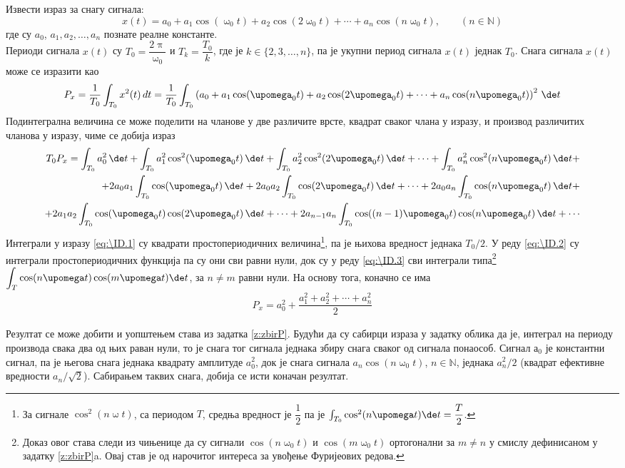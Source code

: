 \noindent 
\PID
Извести израз за снагу сигнала: 
$$
x(t) = a_0 + a_1\cos(\upomega_0 t) +
a_2 \cos(2\upomega_0 t) + \cdots 
+ a_n \cos(n\upomega_0 t), \qquad (n\in\mathbb N)
$$
где су $a_0$, $a_1, a_2, \ldots, a_n$ познате реалне
константе.
\\[2mm]

\RESENJE 
Периоди сигнала $x(t)$ су $T_0 = \dfrac{2\uppi}{\upomega_0}$ и $T_k = \dfrac{T_0}{k}$, где је $k \in \{2,3,\ldots,n\}$, 
па је укупни период сигнала $x(t)$ једнак $T_0$. Снага сигнала $x(t)$ може се изразити као 
\begin{equation}
P_x = \dfrac{1}{T_0}\int_{T_0} x^2(t) \, dt =  \dfrac{1}{T_0} \int_{T_0} \left( a_0 + a_1\cos(\upomega_0 t) +
a_2 \cos(2\upomega_0 t) + \cdots
+ a_n \cos(n\upomega_0 t) \right)^2 \, \de t \\
\end{equation}
Подинтегрална величина се може поделити на чланове у две различите врсте, квадрат сваког члана у изразу, и производ различитих
чланова у изразу, чиме се добија израз
\begin{eqnarray}
T_0 P_x = \int_{T_0} a_0^2 \, \de t + \int_{T_0} a_1^2\cos^2(\upomega_0 t) \, \de t   \label{eq:\ID.1}
+ \int_{T_0} a_2^2 \cos^2(2\upomega_0 t) \, \de t + \cdots + \int_{T_0} a_n^2 \cos^2(n\upomega_0 t) \, \de t + \\
+ 2a_0a_1\int_{T_0} \cos(\upomega_0 t) \, \de t + 
2a_0a_2\int_{T_0} \cos(2\upomega_0 t) \, \de t + \cdots + \label{eq:\ID.2}
2a_0a_n\int_{T_0} \cos(n\upomega_0 t) \, \de t + \\
+ 2a_1a_2\int_{T_0} \cos(\upomega_0 t)\cos(2\upomega_0 t) \, \de t + \cdots + 
2a_{n-1}a_n\int_{T_0} \cos((n-1)\upomega_0 t)\cos(n\upomega_0 t) \, \de t + \cdots   \label{eq:\ID.3}
\end{eqnarray}
Интеграли у изразу \eqref{eq:\ID.1} су квадрати простопериодичних величина\footnote{
За сигнале $\cos^2(n\upomega t)$, са периодом $T$, средња вредност је $\dfrac{1}{2}$ па је 
$\int_{T_0} \cos^2(n\upomega t) \de t = \dfrac{T}{2}$.
}, па је њихова вредност једнака $T_0/2$. У реду \eqref{eq:\ID.2} су интеграли 
простопериодичних функција па су они сви равни нули, док су у реду \eqref{eq:\ID.3} сви интеграли 
типа\footnote{
    Доказ овог става следи из чињенице да су сигнали $\cos(n \upomega_0 t)$ и $\cos(m \upomega_0 t)$
    ортогонални за $m \neq n$ у смислу дефинисаном у задатку \ref{z:zbirP}a. Овај став је од 
    нарочитог интереса за увођење Фуријеових редова.
}
$\displaystyle\int_T \cos(n\upomega t) \cos(m\upomega t) \de t$, за $n \neq m$ равни нули. На основу тога, 
коначно се има
\begin{eqnarray}
    P_x = a_0^2 + \dfrac{ a_1^2 + a_2^2 + \cdots + a_n^2 }{2}
\end{eqnarray}

Резултат се може добити и уопштењем става из задатка \ref{z:zbirP}. Будући да су сабирци израза у задатку облика 
да је, интеграл на периоду производа свака два од њих раван нули, то је снага тог сигнала једнака збиру снага сваког 
од сигнала понаособ. Сигнал $а_0$ је константни сигнал, па је његова снага једнака квадрату амплитуде 
$a_0^2$, док је снага сигнала $a_n \cos(n\upomega_0 t)$, $n \in \mathbb N$, једнака $a_n^2/2$ (квадрат ефективне вредности
$a_n/\sqrt 2$). Сабирањем таквих снага, добија се исти коначан резултат.
 